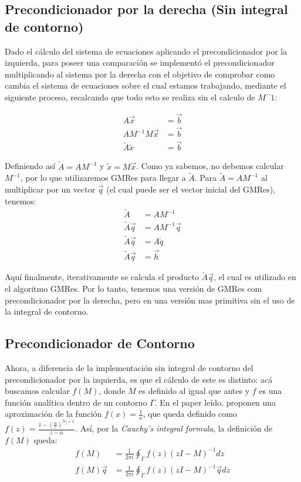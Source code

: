 \documentclass[fleqn]{article}
\providecommand{\DIFdelbegin}{} %
\begin{document}
\subsection{Precondicionador por la derecha (Sin integral de contorno)}

Dado el cálculo del sistema de ecuaciones aplicando el precondicionador por la izquierda, para poseer una comparación se implementó el precondicionador multiplicando al sistema por la derecha con el objetivo de comprobar como cambia el sistema de ecuaciones sobre el cual estamos trabajando, mediante el siguiente proceso, recalcando que todo esto se realiza sin el calculo de $M^-1$:

\begin{align*}
    A\vec{x} &= \vec{b} \\
    A M^{-1} M\vec{x} &= \vec{b} \\
    \widetilde{A}\widetilde{x} &= \vec{b}
\end{align*}

Definiendo así $\widetilde{A} = AM^{-1}$ y $\widetilde{x} = M\vec{x}$. Como ya sabemos, no debemos calcular $M^{-1}$, por lo que utilizaremos GMRes para llegar a $\widetilde{A}$. Para $\widetilde{A} = AM^{-1}$ al multiplicar por un vector $\vec{q}$ (el cual puede ser el vector inicial del GMRes), tenemos:
\begin{align*}
    \widetilde{A} &= AM^{-1} \\
    \widetilde{A}\vec{q} &= AM^{-1}\vec{q}\\
    \widetilde{A}\vec{q} &= A\widetilde{q}\\
    \widetilde{A}\vec{q} &= \vec{h}
\end{align*}

Aquí finalmente, iterativamente se calcula el producto $\widetilde{A}\vec{q}$, el cual es utilizado en el algoritmo GMRes. Por lo tanto, tenemos una versión de GMRes com precondicionador por la derecha, pero en una versión mas primitiva sin el uso de la integral de contorno.


\subsection{Precondicionador de Contorno}

Ahora, a diferencia de la implementación sin integral de contorno del precondicionador por la izquierda, es que el cálculo de este es distinto: acá buscamos calcular $f(M)$, donde $M$ es definido al igual que antes y $f$ es una función analítica dentro de un contorno $\Gamma$. En el paper leído, proponen una aproximación de la función $f(x) = \displaystyle{\frac{1}{x}}$, que queda definido como $f(z) = \displaystyle{\frac{1 - (\frac{\alpha}{z})^{N_f + 1}}{z - \alpha}}$. Así, por la \textit{Cauchy's integral formula}, la definición de $f(M)$ queda:
\begin{align*}
    f(M) &= \frac{1}{2\pi i} \oint_{\Gamma} f(z)(zI - M)^{-1}dz \\
    f(M)\vec{q} &= \frac{1}{2\pi i} \oint_{\Gamma} f(z)(zI - M)^{-1}\vec{q}dz
\end{align*}
\DIFdelbegin %
\end{document}

